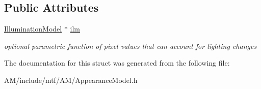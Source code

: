 \subsection*{Public Attributes}
\begin{DoxyCompactItemize}
\item 
\hypertarget{structAMParams_a6e8a27a6b3241a763c6b198b63bef730}{\hyperlink{classIlluminationModel}{Illumination\-Model} $\ast$ \hyperlink{structAMParams_a6e8a27a6b3241a763c6b198b63bef730}{ilm}}\label{structAMParams_a6e8a27a6b3241a763c6b198b63bef730}

\begin{DoxyCompactList}\small\item\em optional parametric function of pixel values that can account for lighting changes \end{DoxyCompactList}\end{DoxyCompactItemize}


The documentation for this struct was generated from the following file\-:\begin{DoxyCompactItemize}
\item 
A\-M/include/mtf/\-A\-M/Appearance\-Model.\-h\end{DoxyCompactItemize}
